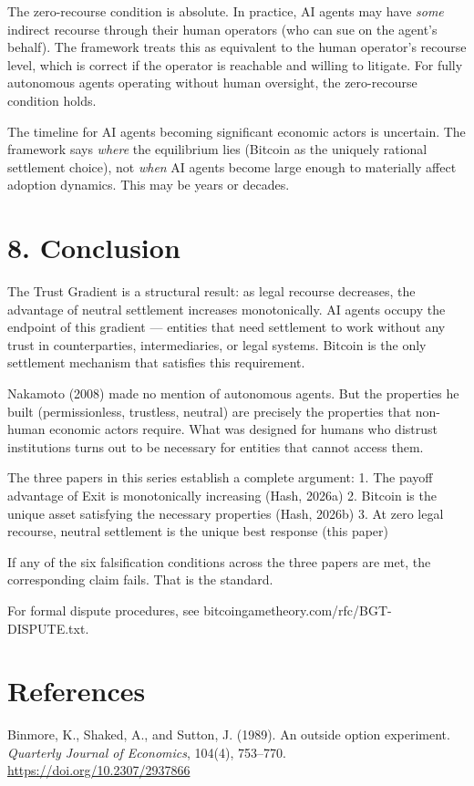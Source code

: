 \documentclass[12pt]{article}
\theoremstyle{definition}
\theoremstyle{remark}
\begin{document}
The zero-recourse condition is absolute. In practice, AI agents may have
\emph{some} indirect recourse through their human operators (who can sue
on the agent's behalf). The framework treats this as equivalent to the
human operator's recourse level, which is correct if the operator is
reachable and willing to litigate. For fully autonomous agents operating
without human oversight, the zero-recourse condition holds.

The timeline for AI agents becoming significant economic actors is
uncertain. The framework says \emph{where} the equilibrium lies (Bitcoin
as the uniquely rational settlement choice), not \emph{when} AI agents
become large enough to materially affect adoption dynamics. This may be
years or decades.
\section{8. Conclusion}\label{conclusion}

The Trust Gradient is a structural result: as legal recourse decreases,
the advantage of neutral settlement increases monotonically. AI agents
occupy the endpoint of this gradient --- entities that need settlement
to work without any trust in counterparties, intermediaries, or legal
systems. Bitcoin is the only settlement mechanism that satisfies this
requirement.

Nakamoto (2008) made no mention of autonomous agents. But the properties
he built (permissionless, trustless, neutral) are precisely the
properties that non-human economic actors require. What was designed for
humans who distrust institutions turns out to be necessary for entities
that cannot access them.

The three papers in this series establish a complete argument: 1. The
payoff advantage of Exit is monotonically increasing (Hash, 2026a) 2.
Bitcoin is the unique asset satisfying the necessary properties (Hash,
2026b) 3. At zero legal recourse, neutral settlement is the unique best
response (this paper)

If any of the six falsification conditions across the three papers are
met, the corresponding claim fails. That is the standard.

For formal dispute procedures, see
bitcoingametheory.com/rfc/BGT-DISPUTE.txt.
\section{References}\label{references}

Binmore, K., Shaked, A., and Sutton, J. (1989). An outside option
experiment. \emph{Quarterly Journal of Economics}, 104(4), 753--770.
\url{https://doi.org/10.2307/2937866}
\end{document}
